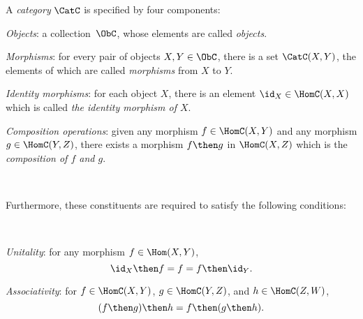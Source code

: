 \begin{shaded}
\begin{definition}[Category] \label{def:categorymain}
A \emph{category} $\CatC$ is specified by four components:
\begin{compactenum}
\item \emph{Objects}: a collection\footnotemark \  $\ObC$, whose elements are called \emph{objects}.
\item \emph{Morphisms}: for every pair of objects $X, Y\in \ObC$, there is a set $\CatC(X, Y)$, the elements of which are called
\emph{morphisms} from $X$ to $Y$.
\item \emph{Identity morphisms}:  for each object $X$, there is
an element $\id_X \in \HomC(X,X) $ which is called \emph{the identity
morphism of $X$}.
\item \emph{Composition operations}: given any morphism $f \in  \HomC(X,Y) $ and any morphism $g \in \HomC(Y, Z)$, there exists a morphism $f\then g$ in $\HomC(X, Z)$ which is the \emph{composition of $f$ and $g$}.
\end{compactenum}

\

Furthermore, these constituents are required to satisfy the following conditions:

\

\begin{compactenum}
    \item \emph{Unitality}: for any morphism $f\in\Hom(X,Y)$,
    \begin{equation}
        \id_X \then f= f = f \then \id_Y.
    \end{equation}
    \item \emph{Associativity}: for $f\in \HomC(X,Y)$, $g\in \HomC(Y,Z)$, and $h\in \HomC(Z,W)$,
    \begin{equation}
        (f\then g)\then h= f \then (g \then h).
    \end{equation}
\end{compactenum}

\end{definition}
\end{shaded}

